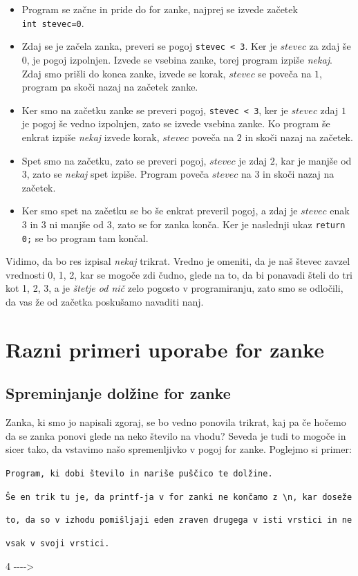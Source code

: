 \documentclass{book}
\begin{document}
\begin{itemize}
	\item Program se začne in pride do for zanke,
	najprej se izvede začetek \texttt{int~stevec=0}.
	\item Zdaj se je začela zanka, preveri se pogoj \texttt{stevec~<~3}.
	Ker je $stevec$ za zdaj še $0$, je pogoj izpolnjen. Izvede se vsebina zanke,
	torej program izpiše \emph{nekaj}. Zdaj smo prišli do konca zanke,
	izvede se korak, $stevec$ se poveča na $1$, program pa skoči nazaj na
	začetek zanke.
	\item Ker smo na začetku zanke se preveri pogoj, \texttt{stevec~<~3},
	ker je $stevec$ zdaj $1$ je pogoj še vedno izpolnjen, zato se izvede
	vsebina zanke. Ko program še enkrat izpiše \emph{nekaj} izvede korak,
	$stevec$ poveča na $2$ in skoči nazaj na začetek.
	\item Spet smo na začetku, zato se preveri pogoj, $stevec$ je zdaj $2$,
	kar je manjše od $3$, zato se \emph{nekaj} spet izpiše. Program poveča
	$stevec$ na $3$ in skoči nazaj na začetek.
	\item Ker smo spet na začetku se bo še enkrat preveril pogoj,
	a zdaj je $stevec$ enak $3$ in $3$ ni manjše od $3$,
	zato se for zanka konča. Ker je naslednji ukaz \texttt{return 0;} se bo
	program tam končal.
\end{itemize}

Vidimo, da bo res izpisal \emph{nekaj} trikrat. Vredno je omeniti,
da je naš števec zavzel vrednosti 0, 1, 2, kar se mogoče zdi čudno, glede na
to, da bi ponavadi šteli do tri kot 1, 2, 3, a je \emph{štetje od nič} zelo
pogosto v programiranju, zato smo se odločili, da vas že od začetka poskušamo
navaditi nanj.

\section{Razni primeri uporabe for zanke}

\subsection{Spreminjanje dolžine for zanke}
Zanka, ki smo jo napisali zgoraj, se bo vedno ponovila trikrat,
kaj pa če hočemo da se zanka ponovi glede na neko število na vhodu?
Seveda je tudi to mogoče in sicer tako, da vstavimo našo spremenljivko v pogoj
for zanke. Poglejmo si primer:

\begin{examples}
\verb+Program, ki dobi število in nariše puščico te dolžine.+

\verb+Še en trik tu je, da printf-ja v for zanki ne končamo z \n, kar doseže+

\verb+to, da so v izhodu pomišljaji eden zraven drugega v isti vrstici in ne+

\verb+vsak v svoji vrstici.+


\begin{inout}
	4
	\tcblower
	-{}-{}-{}->
\end{inout}

\end{examples}
\end{document}
